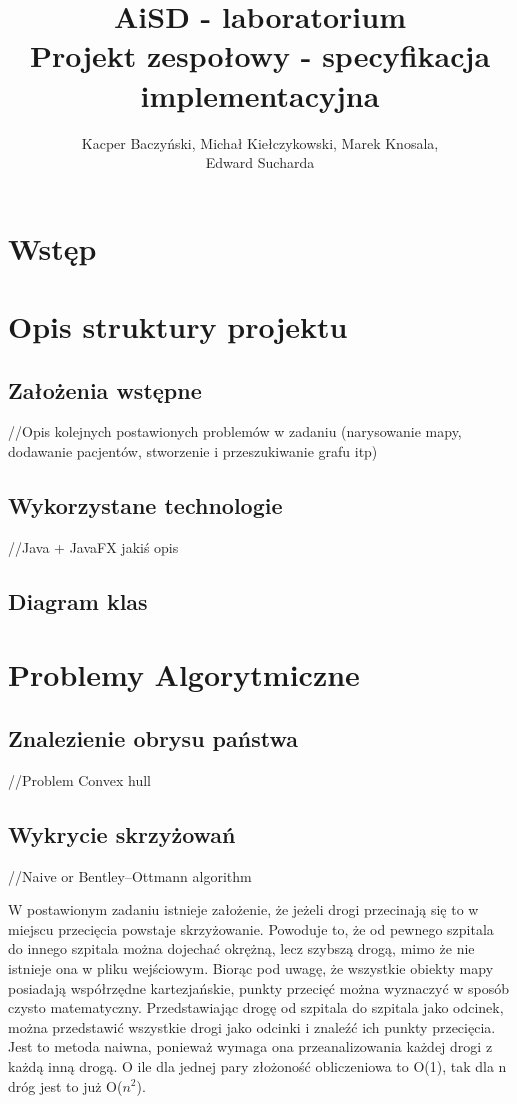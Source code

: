 \documentclass[10pt,a4paper]{article}
\title{\huge AiSD - laboratorium \\ \Large Projekt zespołowy - specyfikacja implementacyjna}
\author{Kacper Baczyński, Michał Kiełczykowski, Marek Knosala, \\ Edward Sucharda}
\begin{document}
\maketitle

\section{Wstęp}

\section{Opis struktury projektu}

\subsection{Założenia wstępne}

//Opis kolejnych postawionych problemów w zadaniu (narysowanie mapy, dodawanie pacjentów, stworzenie i przeszukiwanie grafu itp)

\subsection{Wykorzystane technologie}

//Java + JavaFX jakiś opis

\subsection{Diagram klas}

\section{Problemy Algorytmiczne}

\subsection{Znalezienie obrysu państwa}

//Problem Convex hull

\subsection{Wykrycie skrzyżowań}

//Naive or Bentley–Ottmann algorithm


W postawionym zadaniu istnieje założenie, że jeżeli drogi przecinają się to w miejscu przecięcia powstaje skrzyżowanie.
Powoduje to, że od pewnego szpitala do innego szpitala można dojechać okrężną, lecz szybszą drogą, mimo że nie istnieje ona w pliku wejściowym.
Biorąc pod uwagę, że wszystkie obiekty mapy posiadają współrzędne kartezjańskie, punkty przecięć można wyznaczyć w sposób czysto matematyczny.
Przedstawiając drogę od szpitala do szpitala jako odcinek, można przedstawić wszystkie drogi jako odcinki i znaleźć ich punkty przecięcia.
Jest to metoda naiwna, ponieważ wymaga ona przeanalizowania każdej drogi z każdą inną drogą.
O ile dla jednej pary złożoność obliczeniowa to O(1), tak dla n dróg jest to już O($n^2$).
\end{document}
